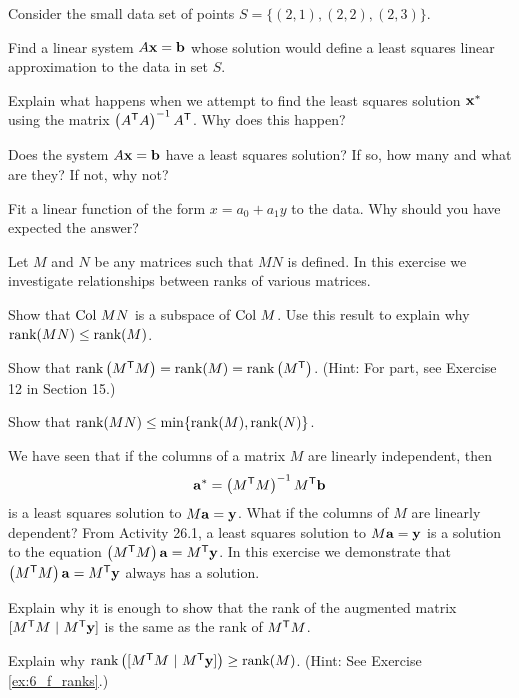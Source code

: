 \item \label{ex:6_f_not_li} Consider the small data set of points $S = \{(2,1), (2,2), (2,3)\}$. 
\ba 
\item Find a linear system $A \mathbf{x} = \mathbf{b}$ whose solution would define a least squares linear approximation to the data in set $S$.

\item Explain what happens when we attempt to find the least squares solution $\mathbf{x}^*$ using the matrix $\left(A^{\mathsf{T}}A\right)^{-1}A^{\mathsf{T}}$. Why does this happen?

\item Does the system $A \mathbf{x} = \mathbf{b}$ have a least squares solution? If so, how many and what are they? If not, why not?

\item Fit a linear function of the form $x = a_0 + a_1y$ to the data. Why should you have expected the answer?  

\ea

\item \label{ex:6_f_ranks} Let $M$ and $N$ be any matrices such that $MN$ is defined. In this exercise we investigate relationships between ranks of various matrices. 
\ba
\item Show that $\text{Col } MN$ is a subspace of $\text{Col } M$. Use this result to explain why $\text{rank}(MN) \leq \text{rank}(M)$. 

\item Show that $\text{rank}\left(M^{\mathsf{T}}M\right) = \text{rank}(M) = \text{rank}\left(M^{\mathsf{T}}\right)$. (Hint: For part, see Exercise 12 in Section 15.)

\item Show that $\text{rank}(MN) \leq \min\{\text{rank}(M), \text{rank}(N)\}$. 

\ea

\item We have seen that if the columns of a matrix $M$ are linearly independent, then 
\[\mathbf{a}^* = \left(M^{\mathsf{T}}M\right)^{-1}M^{\mathsf{T}} \mathbf{b}\]
 is a least squares solution to $M \mathbf{a} = \mathbf{y}$. What if the columns of $M$ are linearly dependent? From Activity 26.1, a least squares solution to $M \mathbf{a} = \mathbf{y}$ is a solution to the equation $\left(M^{\mathsf{T}}M\right)\mathbf{a} = M^{\mathsf{T}}\mathbf{y}$.  In this exercise we demonstrate that $\left(M^{\mathsf{T}}M\right)\mathbf{a} = M^{\mathsf{T}}\mathbf{y}$ always has a solution. 
\ba
\item Explain why it is enough to show that the rank of the augmented matrix $[M^{\mathsf{T}}M \ | \ M^{\mathsf{T}}\mathbf{y}]$ is the same as the rank of $M^{\mathsf{T}}M$.

\item Explain why $\rank\left([M^{\tr}M \ | \ M^{\tr}\vy]\right) \geq \rank(M)$. (Hint: See Exercise \ref{ex:6_f_ranks}.)

